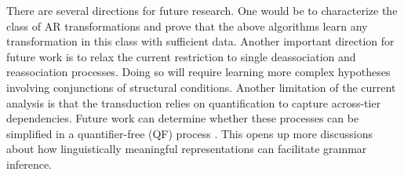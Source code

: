\documentclass[pmlr]{jmlr}%
\begin{document}
	There are several directions for future research. One would be to characterize the class of AR transformations and prove that the above algorithms learn any transformation in this class with sufficient data. 
	Another important direction for future work is to relax the current
	restriction to single deassociation and reassociation processes.
	Doing so will require learning more complex hypotheses involving
	conjunctions of structural conditions.
	Another limitation of the current analysis is that the transduction relies 
	on quantification to capture across-tier dependencies.
	Future work can determine whether these processes can 
	be simplified in a quantifier-free (QF) process \citep{strother2019diss}.
	This opens up more discussions about how linguistically meaningful 
	representations can facilitate grammar inference.
	
	
	
	
\end{document}
